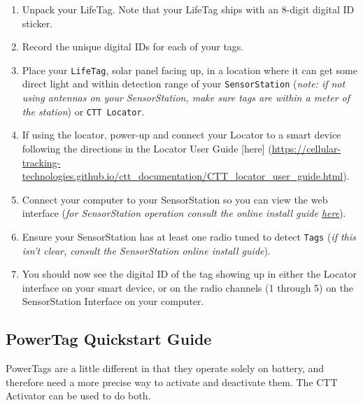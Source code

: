 \documentclass[
]{article}
\begin{document}
\begin{enumerate}
\def\labelenumi{\arabic{enumi}.}
\item
  Unpack your LifeTag. Note that your LifeTag ships with an 8-digit
  digital ID sticker.
\item
  Record the unique digital IDs for each of your tags.
\item
  Place your \texttt{LifeTag}, solar panel facing up, in a location
  where it can get some direct light and within detection range of your
  \texttt{SensorStation} (\emph{note: if not using antennas on your
  SensorStation, make sure tags are within a meter of the station}) or
  \texttt{CTT\ Locator}.
\item
  If using the locator, power-up and connect your Locator to a smart
  device following the directions in the Locator User Guide {[}here{]}
  (\url{https://cellular-tracking-technologies.github.io/ctt_documentation/CTT_locator_user_guide.html}).
\item
  Connect your computer to your SensorStation so you can view the web
  interface (\emph{for SensorStation operation consult the online
  install guide
  \href{https://cellular-tracking-technologies.github.io/ctt_documentation/v2-SensorStation-User-Guide.html\#connecting-to-your-sensorstation-web-interface}{here}}).
\item
  Ensure your SensorStation has at least one radio tuned to detect
  \texttt{Tags} (\emph{if this isn't clear, consult the SensorStation
  online install guide}).
\item
  You should now see the digital ID of the tag showing up in either the
  Locator interface on your smart device, or on the radio channels (1
  through 5) on the SensorStation Interface on your computer.
\end{enumerate}

\hypertarget{powertag-quickstart-guide}{%
\subsection{PowerTag Quickstart Guide}\label{powertag-quickstart-guide}}

PowerTags are a little different in that they operate solely on battery,
and therefore need a more precise way to activate and deactivate them.
The CTT Activator can be used to do both.
\end{document}
